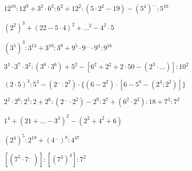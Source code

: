 \begin{esercizio} %
\(12^{10}:12^9+3^2\cdot6^2:6^2+12^2:(5\cdot2^2-19)-(5^4)^{\dots}:5^{10}\)
\end{esercizio}
\begin{esercizio} %
\((2^2)^3+(22-5\cdot4)^2+{\dots}^2-4^2\cdot5\) 
\end{esercizio}
\begin{esercizio} %
\((3^5)^3:3^{13}+3^{10}:3^9+9^5\cdot9^{\dots}\cdot9^4:9^{16}\) 
\end{esercizio}
\begin{esercizio} %
\(3^3\cdot3^7\cdot3^2:(3^6\cdot3^6)+5^2-[6^2+2^2+2\cdot50-(2^3\cdot{\dots})]:
10^2\) 
\end{esercizio}
\begin{esercizio} %
\((2\cdot5)^3:5^3-(2^{\dots}:2^2)\cdot\{(6-2^2)\cdot[6-5^0-(2^4:2^2)]\}\)
\end{esercizio}
\begin{esercizio} %
\(2^2\cdot2^6:2^5:2+2^6:(2^{\dots}\cdot2^2)-2^9:2^7+(6^2\cdot2^2):18+7^3:7^2\)
\end{esercizio}
\begin{esercizio} %
\(1^4+(21+{\dots}-3^3)^2-(2^2+4^2+6)\) 
\end{esercizio}
\begin{esercizio} %
\((2^4)^5:2^{19}+(4^{\dots})^8:4^{47}\) 
\end{esercizio}
\begin{esercizio} %
\([(7^5\cdot7^{\dots})]:[(7^3)^4]:7^2\) 
\end{esercizio}

